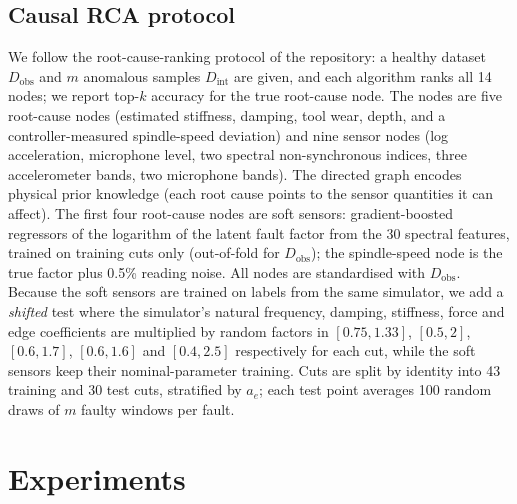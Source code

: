 \documentclass[11pt]{article}
\begin{document}
\subsection{Causal RCA protocol}
We follow the root-cause-ranking protocol of the repository: a healthy dataset $D_{\mathrm{obs}}$ and $m$ anomalous samples $D_{\mathrm{int}}$ are given, and each algorithm ranks all 14 nodes; we report top-$k$ accuracy for the true root-cause node.
The nodes are five root-cause nodes (estimated stiffness, damping, tool wear, depth, and a controller-measured spindle-speed deviation) and nine sensor nodes (log acceleration, microphone level, two spectral non-synchronous indices, three accelerometer bands, two microphone bands).
The directed graph encodes physical prior knowledge (each root cause points to the sensor quantities it can affect).
The first four root-cause nodes are soft sensors: gradient-boosted regressors of the logarithm of the latent fault factor from the 30 spectral features, trained on training cuts only (out-of-fold for $D_{\mathrm{obs}}$); the spindle-speed node is the true factor plus 0.5\% reading noise.
All nodes are standardised with $D_{\mathrm{obs}}$.
Because the soft sensors are trained on labels from the same simulator, we add a \emph{shifted} test where the simulator's natural frequency, damping, stiffness, force and edge coefficients are multiplied by random factors in $[0.75,1.33]$, $[0.5,2]$, $[0.6,1.7]$, $[0.6,1.6]$ and $[0.4,2.5]$ respectively for each cut, while the soft sensors keep their nominal-parameter training.
Cuts are split by identity into 43 training and 30 test cuts, stratified by $a_e$; each test point averages 100 random draws of $m$ faulty windows per fault.

\section{Experiments}
\end{document}
